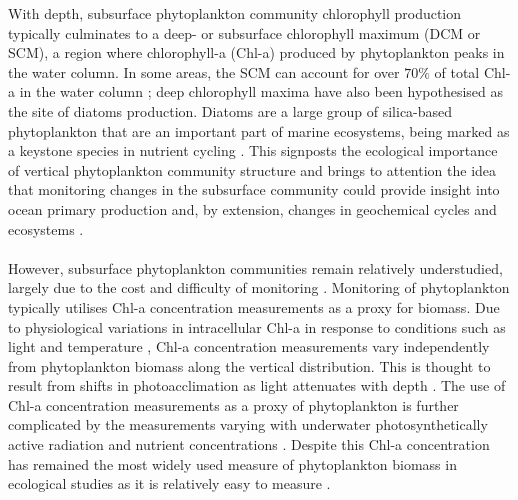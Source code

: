 \documentclass{article}
\begin{document}
With depth, subsurface phytoplankton community chlorophyll production typically culminates to a deep- or subsurface chlorophyll maximum (DCM or SCM), a region where chlorophyll-a (Chl-a) produced by phytoplankton peaks in the water column. In some areas, the SCM can account for over $70\%$ of total Chl-a in the water column \citep{zhuang_phytoplankton_2020}; deep chlorophyll maxima have also been hypothesised as the site of diatoms production. Diatoms are a large group of silica-based phytoplankton that are an important part of marine ecosystems, being marked as a keystone species in nutrient cycling \citep{medlin_why_2002}. This signposts the ecological importance of vertical phytoplankton community structure and brings to attention the idea that monitoring changes in the subsurface community could provide insight into ocean primary production and, by extension, changes in geochemical cycles and ecosystems \citep{boyce_global_2010,ross_blooms_2017}.\\ \\
\noindent
However, subsurface phytoplankton communities remain relatively understudied, largely due to the cost and difficulty of monitoring \citep{hogle_pervasive_2018}. Monitoring of phytoplankton typically utilises Chl-a concentration measurements as a proxy for biomass. Due to physiological variations in intracellular Chl-a in response to conditions such as light and temperature \citep{behrenfeld_beam_2006,geider_dynamic_1996}, Chl-a concentration measurements vary independently from phytoplankton biomass along the vertical distribution. This is thought to result from shifts in photoacclimation as light attenuates with depth \citep{cullen_subsurface_2015,fennel_subsurface_2003}. The use of Chl-a concentration measurements as a proxy of phytoplankton is further complicated by the measurements varying with underwater photosynthetically active radiation and nutrient concentrations \citep{alvarez-fernandez_chlorophyll_2014}. Despite this Chl-a concentration has remained the most widely used measure of phytoplankton biomass in ecological studies as it is relatively easy to measure \citep{boyce_global_2010}.\\ \\
\noindent
\end{document}
